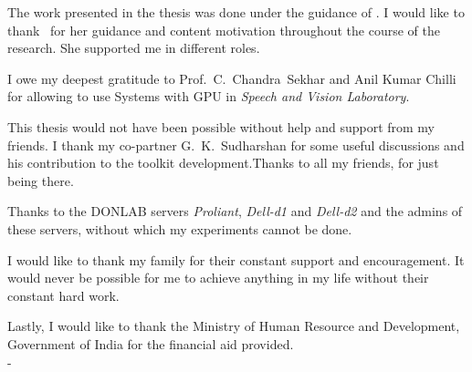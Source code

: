 \acknowledgements
The work presented in the thesis was done under the guidance of \thesisguide . I would like to thank \thesisguide ~for her guidance  and content motivation throughout the course of the research. She supported me in different roles.

I owe my deepest gratitude to Prof.~C.~Chandra~Sekhar and Anil Kumar Chilli for allowing to use Systems with GPU in {\it Speech and Vision Laboratory}.


This thesis would not have been possible without help and support from my friends. I thank my co-partner G.~K.~Sudharshan for some useful discussions and his contribution to the toolkit development.Thanks to all my friends, for just being there.

Thanks to the DONLAB servers \textit{Proliant}, \textit{Dell-d1} and \textit{Dell-d2} and the admins of these servers, without which my experiments cannot be done.

I would like to thank my family for their constant support and encouragement. It would never be possible for me to achieve anything in my life without their constant hard work.

Lastly, I would like to thank the Ministry of Human Resource and Development, Government of India for the financial aid provided.\\

\hfill - \thesisauthor
